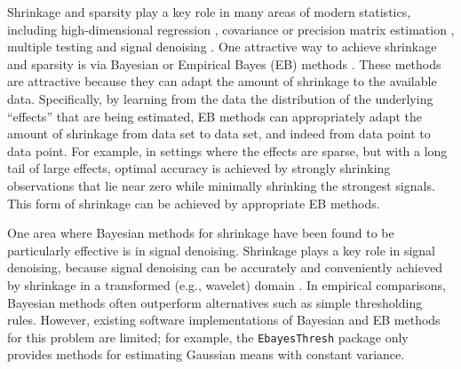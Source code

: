 \documentclass[twoside]{article}
\begin{document}
Shrinkage and sparsity play a key role in many areas of modern
statistics, including high-dimensional regression
\citep{Tibshirani1996Regression}, covariance or precision matrix
estimation \citep{Bickel2008Covariance}, multiple testing
\citep{Efron2004} and signal denoising \citep{Donoho1994Ideal}. One
attractive way to achieve shrinkage and sparsity is via Bayesian or
Empirical Bayes (EB) methods
\citep[e.g.,][]{Efron2002Empirical}. These methods are attractive
because they can adapt the amount of shrinkage to the available
data. Specifically, by learning from the data the distribution of the
underlying ``effects'' that are being estimated, EB methods can
appropriately adapt the amount of shrinkage from data set to data set,
and indeed from data point to data point. For example, in settings
where the effects are sparse, but with a long tail of large effects,
optimal accuracy is achieved by strongly shrinking observations that
lie near zero while minimally shrinking the strongest signals. This
form of shrinkage can be achieved by appropriate EB methods.

One area where Bayesian methods for shrinkage have been found to be
particularly effective is in signal denoising. Shrinkage plays a key
role in signal denoising, because signal denoising can be accurately
and conveniently achieved by shrinkage in a transformed (e.g.,
wavelet) domain \citep{Donoho1994Ideal}. In empirical comparisons,
Bayesian methods often outperform alternatives such as simple
thresholding rules. However, existing software implementations of
Bayesian and EB methods for this problem are limited; for example, the
{\tt EbayesThresh} package \citep{johnstone2005ebayesthresh} only
provides methods for estimating Gaussian means with constant variance.


\end{document}
